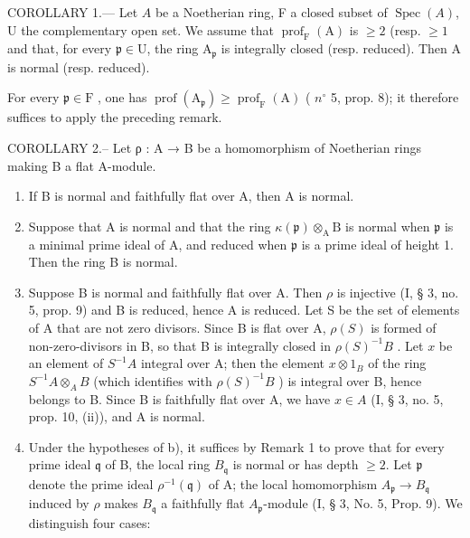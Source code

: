 COROLLARY 1.--- Let \(A\) be a Noetherian ring, F a closed subset of \(\operatorname{Spec}(A)\), U the complementary open set. We assume that \(\operatorname{prof}_{\mathrm{F}}(\mathrm{A})\) is \(\geqslant 2\) (resp. \(\geqslant 1\) and that, for every \(\mathfrak{p} \in \mathrm{U}\), the ring \(\mathrm{A}_{\mathfrak{p}}\) is integrally closed (resp. reduced). Then A is normal (resp. reduced).

For every \(\mathfrak{p} \in \mathrm{F}\) , one has \(\operatorname{prof}(\mathrm{A}_{\mathfrak{p}}) \geqslant \operatorname{prof}_{\mathrm{F}}(\mathrm{A})\) ( \(n^{\circ}\) 5, prop. 8); it therefore suffices to apply the preceding remark.

COROLLARY 2.-- Let ρ : A → B be a homomorphism of Noetherian rings making B a flat A-module.

\begin{enumerate}
\def\labelenumi{\alph{enumi})}
\item
  If B is normal and faithfully flat over A, then A is normal.
\item
  Suppose that A is normal and that the ring \(\kappa(\mathfrak{p})\otimes_{\mathrm{A}}\mathrm{B}\) is normal when \(\mathfrak{p}\) is a minimal prime ideal of A, and reduced when \(\mathfrak{p}\) is a prime ideal of height 1. Then the ring B is normal.
\item
  Suppose B is normal and faithfully flat over A. Then \(\rho\) is injective (I, § 3, no. 5, prop. 9) and B is reduced, hence A is reduced. Let S be the set of elements of A that are not zero divisors. Since B is flat over A, \(\rho(S)\) is formed of non-zero-divisors in B, so that B is integrally closed in \(\rho(S)^{-1}B\) . Let \(x\) be an element of \(S^{-1}A\) integral over A; then the element \(x \otimes 1_B\) of the ring \(S^{-1}A \otimes_A B\) (which identifies with \(\rho(S)^{-1}B\) ) is integral over B, hence belongs to B. Since B is faithfully flat over A, we have \(x \in A\) (I, § 3, no. 5, prop. 10, (ii)), and A is normal.
\item
  Under the hypotheses of b), it suffices by Remark 1 to prove that for every prime ideal \(\mathfrak{q}\) of B, the local ring \(B_{\mathfrak{q}}\) is normal or has depth \(\geqslant 2\). Let \(\mathfrak{p}\) denote the prime ideal \(\rho^{-1}(\mathfrak{q})\) of A; the local homomorphism \(A_{\mathfrak{p}} \to B_{\mathfrak{q}}\) induced by \(\rho\) makes \(B_{\mathfrak{q}}\) a faithfully flat \(A_{\mathfrak{p}}\)-module (I, § 3, No. 5, Prop. 9). We distinguish four cases:
\end{enumerate}

